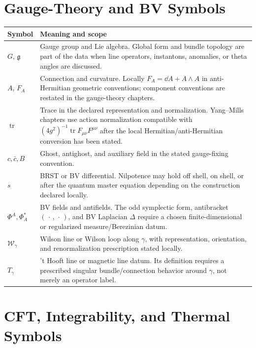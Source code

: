 \section*{Gauge-Theory and BV Symbols}

\begin{longtable}{>{\raggedright\arraybackslash}p{}
                  >{\raggedright\arraybackslash}p{}}
\hline
\textbf{Symbol} & \textbf{Meaning and scope}\\
\hline
\endhead
\(G\), \(\mathfrak g\) &
Gauge group and Lie algebra.  Global form and bundle topology are part of the
data when line operators, instantons, anomalies, or theta angles are
discussed.\\
\(A\), \(F_A\) &
Connection and curvature.  Locally \(F_A=\dd A+A\wedge A\) in
anti-Hermitian geometric conventions; component conventions are restated in
the gauge-theory chapters.\\
\(\operatorname{tr}\) &
Trace in the declared representation and normalization.  Yang--Mills
chapters use action normalization compatible with
\((4g^2)^{-1}\operatorname{tr}F_{\mu\nu}F^{\mu\nu}\) after the local
Hermitian/anti-Hermitian conversion has been stated.\\
\(c,\bar c,B\) &
Ghost, antighost, and auxiliary field in the stated gauge-fixing convention.\\
\(s\) &
BRST or BV differential.  Nilpotence may hold off shell, on shell, or after
the quantum master equation depending on the construction declared locally.\\
\(\Phi^A,\Phi_A^*\) &
BV fields and antifields.  The odd symplectic form, antibracket
\((\,\cdot\,,\,\cdot\,)\), and BV Laplacian \(\Delta\) require a chosen
finite-dimensional or regularized measure/Berezinian datum.\\
\(\mathcal W_\gamma\) &
Wilson line or Wilson loop along \(\gamma\), with representation, orientation,
and renormalization prescription stated locally.\\
\(T_\gamma\) &
't Hooft line or magnetic line datum.  Its definition requires a prescribed
singular bundle/connection behavior around \(\gamma\), not merely an
operator label.\\
\hline
\end{longtable}

\section*{CFT, Integrability, and Thermal Symbols}

